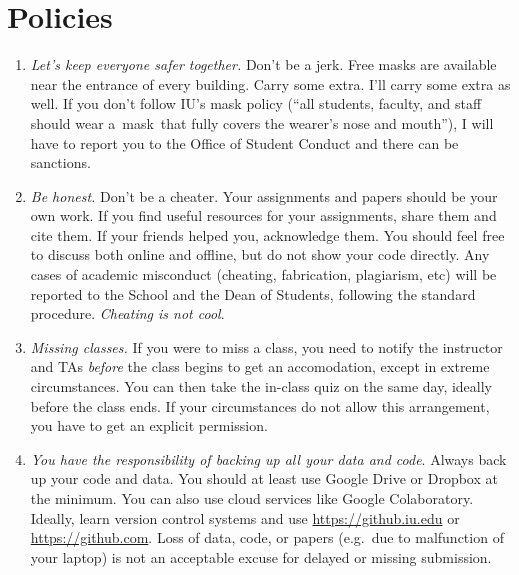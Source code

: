 \documentclass[11pt,article,oneside]{memoir} %
\begin{document}
\section{Policies}%
\begin{enumerate}%
    \setlength\itemsep{1em}
\item \emph{Let's keep everyone safer together.} Don't be a jerk. Free masks are available near the entrance of every building. Carry some extra. I'll carry some extra as well. If you don't follow IU's mask policy (``all students, faculty, and staff should wear a mask that fully covers the wearer’s nose and mouth''), I will have to report you to the Office of Student Conduct and there can be sanctions. 

\item \emph{Be honest.} Don't be a cheater. Your assignments and papers should be your own work.  
If you find useful resources for your assignments, share them and cite them. 
If your friends helped you, acknowledge them. 
You should feel free to discuss both online and offline, but do not show your code directly.  
Any cases of academic misconduct (cheating, fabrication, plagiarism, etc) will be reported to the School and the Dean of Students, following the standard procedure. 
\emph{Cheating is not cool}. 

\item \emph{Missing classes.} 
If you were to miss a class, you need to notify the instructor and TAs \emph{before} the class begins to get an accomodation, except in extreme circumstances. 
You can then take the in-class quiz on the same day, ideally before the class ends. 
If your circumstances do not allow this arrangement, you have to get an explicit permission. 

\item \emph{You have the responsibility of backing up all your data and code}.
Always back up your code and data. You should at least use Google Drive or Dropbox at the minimum.
You can also use cloud services like Google Colaboratory.
Ideally, learn version control systems and use \url{https://github.iu.edu} or \url{https://github.com}. 
Loss of data, code, or papers (e.g.~due to malfunction of your laptop) is not an acceptable excuse for delayed or missing submission. 


\end{enumerate}
\end{document}
